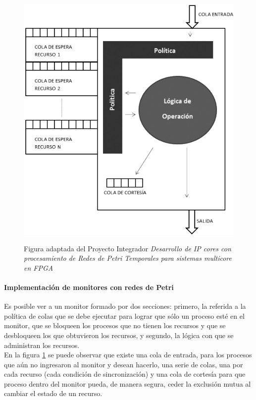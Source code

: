 \begin{figure}[H]
    \centering
    \includegraphics[scale=0.5]{images/monitor_mico.png}
    \caption[Monitor.]{Figura adaptada del Proyecto Integrador \textit{Desarrollo de IP cores con procesamiento de Redes de Petri Temporales para sistemas multicore en FPGA}}\cite{papermico}
    \label{fig:monitormico}
\end{figure}

\paragraph{Implementación de monitores con redes de Petri}
Es posible ver a un monitor formado por dos secciones: primero, la referida a la política de colas que se debe ejecutar para lograr que sólo un proceso esté en el monitor, que se bloqueen los procesos que no tienen los recursos y que se desbloqueen los que obtuvieron los recursos, y segundo, la lógica con que se administran los recursos.\\
En la figura \ref{fig:monitormico} se puede observar que existe una cola de entrada, para los procesos que aún no ingresaron al monitor y desean hacerlo, una serie de colas, una por cada recurso (cada condición de sincronización) y una cola de cortesía para que  proceso dentro del monitor pueda, de manera segura, ceder la exclusión mutua al cambiar el estado de un recurso.\\

